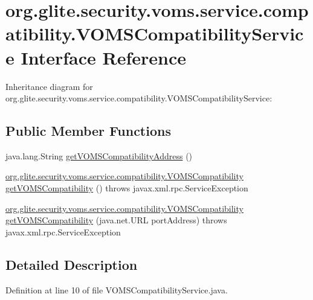 \hypertarget{interfaceorg_1_1glite_1_1security_1_1voms_1_1service_1_1compatibility_1_1VOMSCompatibilityService}{
\section{org.glite.security.voms.service.compatibility.VOMSCompatibilityService Interface Reference}
\label{interfaceorg_1_1glite_1_1security_1_1voms_1_1service_1_1compatibility_1_1VOMSCompatibilityService}
}


Inheritance diagram for org.glite.security.voms.service.compatibility.VOMSCompatibilityService:
\subsection*{Public Member Functions}
\begin{DoxyCompactItemize}
\item 
java.lang.String \hyperlink{interfaceorg_1_1glite_1_1security_1_1voms_1_1service_1_1compatibility_1_1VOMSCompatibilityService_ae7271de8da8106e70ae10f4f1d11c8c7}{getVOMSCompatibilityAddress} ()
\item 
\hyperlink{interfaceorg_1_1glite_1_1security_1_1voms_1_1service_1_1compatibility_1_1VOMSCompatibility}{org.glite.security.voms.service.compatibility.VOMSCompatibility} \hyperlink{interfaceorg_1_1glite_1_1security_1_1voms_1_1service_1_1compatibility_1_1VOMSCompatibilityService_a03f2aec60c23f8c05fd55608b625969e}{getVOMSCompatibility} ()  throws javax.xml.rpc.ServiceException
\item 
\hyperlink{interfaceorg_1_1glite_1_1security_1_1voms_1_1service_1_1compatibility_1_1VOMSCompatibility}{org.glite.security.voms.service.compatibility.VOMSCompatibility} \hyperlink{interfaceorg_1_1glite_1_1security_1_1voms_1_1service_1_1compatibility_1_1VOMSCompatibilityService_a269f388a966687cdde12e8e4652a3366}{getVOMSCompatibility} (java.net.URL portAddress)  throws javax.xml.rpc.ServiceException
\end{DoxyCompactItemize}


\subsection{Detailed Description}


Definition at line 10 of file VOMSCompatibilityService.java.



